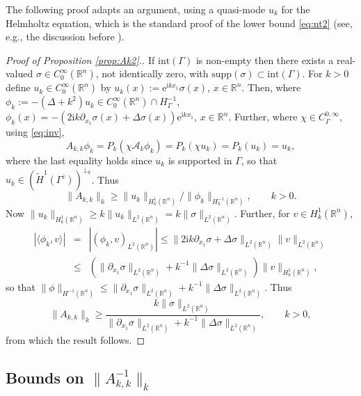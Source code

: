 \documentclass{birkjour}
\theoremstyle{definition}
\theoremstyle{remark}
\numberwithin{equation}{section}
\newcommand{\R}{\mathbb{R}}
\newcommand{\ri}{\mathrm{i}}
\newcommand{\cA}{\mathcal{A}}
\newcommand{\supp}{\mathrm{supp}}
\newcommand{\re}{\mathrm{e}}
\begin{document}
The following proof adapts an argument, using a quasi-mode $u_k$ for the Helmholtz equation, which is the standard proof of the lower bound \eqref{eq:nt2}  (see, e.g., the discussion before \cite[Lem.~3.10]{CWMonk2008}).

\begin{proof}[Proof of Proposition \ref{prop:Ak2}.] If $\mathrm{int}(\Gamma)$ is non-empty then there exists a real-valued $\sigma\in C_0^\infty(\R^n)$, not identically zero, with $\supp(\sigma)\subset \mathrm{int}(\Gamma)$. For $k>0$ define $u_k\in C_0^\infty(\R^n)$ by $u_k(x) := \re^{\ri k x_1} \sigma(x)$, $x\in \R^n$. Then, where $\phi_k:=-(\Delta +k^2) u_k\in C_0^\infty(\R^n)\cap H^{-1}_\Gamma$, $\phi_k(x) = -(2\ri k \partial_{x_1}\sigma(x) +\Delta\sigma(x))\re^{\ri k x_1}$, $x\in \R^n$. Further, where $\chi\in C^{0,\infty}_\Gamma$, using \eqref{eq:inv},
$$
A_{k,k}\phi_k = P_k(\chi\cA_k\phi_k) = P_k(\chi u_k) = P_k(u_k)=u_k,
$$
where the last equality holds since $u_k$ is supported in $\Gamma$, so that $u_k\in (\widetilde H^1(\Gamma^c))^{\perp_k}$. Thus
$$
\|A_{k,k}\|_k \geq \|u_k\|_{H^1_k(\R^n)}/\|\phi_k\|_{H^{-1}_k(\R^n)}, \qquad k>0.
$$
Now $\|u_k\|_{H^1_k(\R^n)}\geq k\|u_k\|_{L^2(\R^n)} = k\|\sigma\|_{L^2(\R^n)}$. Further, for $v\in H^1_k(\R^n)$,
\begin{eqnarray*}
|\langle \phi_k,v\rangle| &=& |(\phi_k,v)_{L^2(\R^n)}| \leq \|2\ri k \partial_{x_1}\sigma + \Delta \sigma\|_{L^2(\R^n)}\|v\|_{L^2(\R^n)}\\
& \leq & (\|\partial_{x_1}\sigma\|_{L^2(\R^n)} + k^{-1}\|\Delta \sigma\|_{L^2(\R^n)})\|v\|_{H^1_k(\R^n)},
\end{eqnarray*}
so that $\|\phi\|_{H^{-1}(\R^n)} \leq \|\partial_{x_1}\sigma\|_{L^2(\R^n)} + k^{-1}\|\Delta \sigma\|_{L^2(\R^n)}$. Thus
$$
\|A_{k,k}\|_k \geq \frac{k\|\sigma\|_{L^2(\R^n)}}{\|\partial_{x_1}\sigma\|_{L^2(\R^n)} + k^{-1}\|\Delta \sigma\|_{L^2(\R^n)}}, \qquad k>0,
$$
from which the result follows.
\end{proof}

\subsection{Bounds on $\|A_{k,k}^{-1}\|_k$} \label{sec:Ainv}
\end{document}
